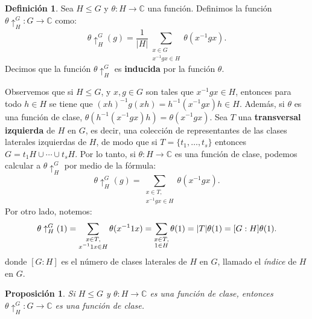 \documentclass[12pt]{book}
\newtheorem{proposition}[theorem]{Proposición}
\theoremstyle{definition}
\newtheorem{definition}[theorem]{Definición}
\newcounter{in}
\newcounter{ini}
\begin{document}
\begin{definition}
  Sea $H\leq G$ y $\theta:H\rightarrow \mathbb{C}$ una función. Definimos la
  función $\theta\uparrow^{G}_{H}:G\rightarrow \mathbb{C}$ como:
  \begin{equation*}
    \theta\uparrow^{G}_{H}(g)=\frac{1}{|H|}\sum_{\substack{x\in
        G\\x^{-1}gx\in H}}\theta(x^{-1}gx).
  \end{equation*}
  Decimos que la función $\theta\uparrow^{G}_{H}$ es \textbf{inducida}
  por la función $\theta$.
\end{definition}
Observemos que si $H\leq G$, y $x,g\in G$ son tales que $x^{-1}gx\in
H$, entonces para todo $h\in H$ se tiene que
$(xh)^{-1}g(xh)=h^{-1}(x^{-1}gx)h\in H$. Además, si $\theta$ es una función de
clase, $\theta(h^{-1}(x^{-1}gx)h)=\theta(x^{-1}gx)$. Sea $T$ una \textbf{transversal izquierda} de $H$ en $G$, es decir, una
colección de representantes de las clases laterales izquierdas de $H$,
de modo que si $T=\{t_{1},\ldots,t_{s}\}$ entonces
$G=t_{1}H\cup\cdots\cup t_{s}H$. Por lo tanto, si
$\theta:H\rightarrow\mathbb{C}$ es una función de clase, podemos
calcular a $\theta\uparrow^{G}_{H}$ por medio de la fórmula:
\begin{equation}
  \label{fun-ind-trans}
  \theta\uparrow^{G}_{H}(g)=\sum_{\substack{x\in T,\\x^{-1}gx\in H}}\theta(x^{-1}gx).
\end{equation}
Por otro lado, notemos:
\begin{equation*}
  \theta\uparrow^{G}_{H}(1)=\sum_{\substack{x\in T,\\x^{-1}1x\in
      H}}\theta(x^{-1}1x)=\sum_{\substack{x\in T,\\1\in
      H}}\theta(1)=|T|\theta(1)=[G:H]\theta(1).\\
\end{equation*}
donde $[G:H]$ es el número de clases laterales de $H$ en $G$, llamado
el \emph{índice} de $H$ en $G$.
\begin{proposition}
  Si $H\leq G$ y $\theta:H\rightarrow \mathbb{C}$ es una función de
  clase, entonces $\theta\uparrow^{G}_{H}:G\rightarrow \mathbb{C}$ es
  una función de clase. 
\end{proposition}
\end{document}

